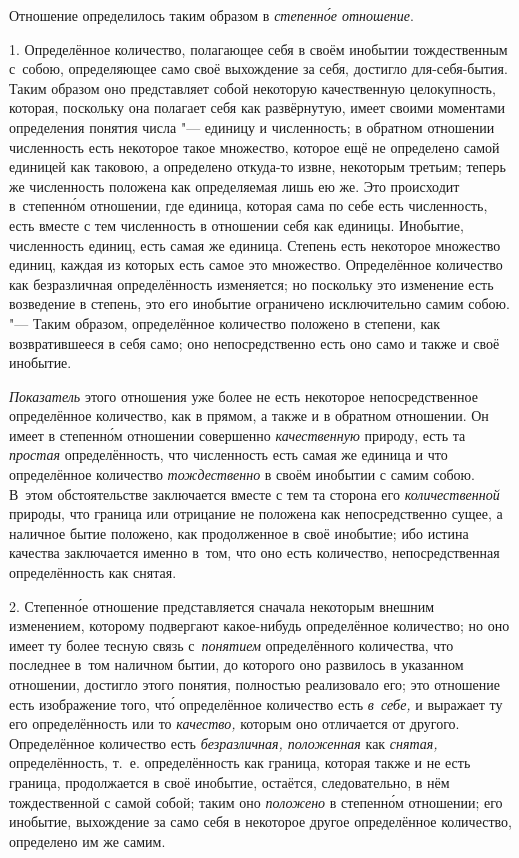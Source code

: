 Отношение определилось таким образом в {\em степенн\'{о}е отношение}.


1. Определённое количество, полагающее себя в своём инобытии тождественным
с~собою, определяющее само своё выхождение за себя, достигло для-себя-бытия.
Таким образом оно представляет собой некоторую качественную целокупность,
которая, поскольку она полагает себя как развёрнутую, имеет своими моментами
определения понятия числа "--- единицу и численность; в обратном отношении
численность есть некоторое такое множество, которое ещё не определено самой
единицей как таковою, а определено откуда-то извне, некоторым третьим; теперь
же численность положена как определяемая лишь ею же. Это происходит
в~степенн\'{о}м отношении, где единица, которая сама по себе есть численность,
есть вместе с тем численность в отношении себя как единицы. Инобытие,
численность единиц, есть самая же единица. Степень есть некоторое множество
единиц, каждая из которых есть самое это множество. Определённое количество как
безразличная определённость изменяется; но поскольку это изменение есть
возведение в степень, это его инобытие ограничено исключительно самим собою.
"--- Таким образом, определённое количество положено в степени, как
возвратившееся в себя само; оно непосредственно есть оно само и также
и своё инобытие.

{\em Показатель} этого отношения уже более не есть некоторое непосредственное
определённое количество, как в прямом, а также и в обратном отношении. Он имеет
в степенн\'{о}м отношении совершенно {\em качественную} природу, есть та
{\em простая} определённость, что численность есть самая же единица и что
определённое количество {\em тождественно} в своём инобытии с самим собою.
В~этом обстоятельстве заключается вместе с тем та сторона его
{\em количественной} природы, что граница или отрицание не положена как
непосредственно сущее, а наличное бытие положено, как продолженное в своё
инобытие; ибо истина качества заключается именно в~том, что оно есть
количество, непосредственная определённость как снятая.

2. Степенн\'{о}е отношение представляется сначала некоторым внешним изменением,
которому подвергают какое-нибудь определённое количество; но оно имеет ту более
тесную связь с~{\em понятием} определённого количества, что последнее в~том
наличном бытии, до которого оно развилось в указанном отношении, достигло этого
понятия, полностью реализовало его; это отношение есть изображение того,
чт\'{о} определённое количество есть {\em в~себе,} и выражает ту его
определённость или то {\em качество,} которым оно отличается от другого.
Определённое количество есть {\em безразличная, положенная} как {\em снятая,}
определённость, т.~е. определённость как граница, которая также и не есть
граница, продолжается в своё инобытие, остаётся, следовательно, в нём
тождественной с самой собой; таким оно {\em положено} в степенн\'{о}м
отношении; его инобытие, выхождение за само себя в некоторое другое
определённое количество, определено им же самим.

